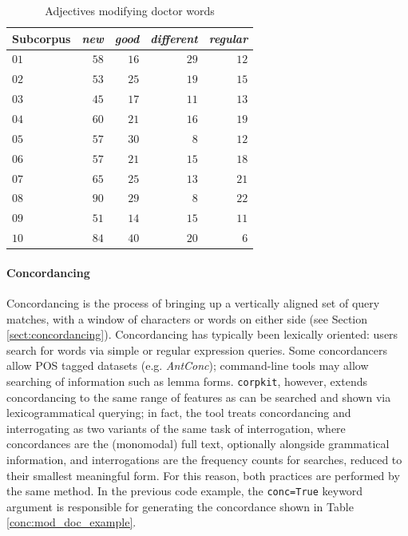 \FloatBarrier


\begin{table}[htb]
\centering
\small
\begin{tabular}{lrrrr}

\toprule
Subcorpus &  \emph{new} &  \emph{good} &  \emph{different} &  \emph{regular} \\
\midrule
$01$ &   $58$ &    $16$ &         $29$ &       $12$ \\
$02$ &   $53$ &    $25$ &         $19$ &       $15$ \\
$03$ &   $45$ &    $17$ &         $11$ &       $13$ \\
$04$ &   $60$ &    $21$ &         $16$ &       $19$ \\
$05$ &   $57$ &    $30$ &         $ 8$ &       $12$ \\
$06$ &   $57$ &    $21$ &         $15$ &       $18$ \\
$07$ &   $65$ &    $25$ &         $13$ &       $21$ \\
$08$ &   $90$ &    $29$ &         $ 8$ &       $22$ \\
$09$ &   $51$ &    $14$ &         $15$ &       $11$ \\
$10$ &   $84$ &    $40$ &         $20$ &       $ 6$ \\
\bottomrule
\end{tabular}
\caption{Adjectives modifying doctor words}
\label{conc:adj_mod_doc_example}
\end{table}

\paragraph{Concordancing}

Concordancing is the process of bringing up a vertically aligned set of query matches, with a window of characters or words on either side (see Section \ref{sect:concordancing}). Concordancing has typically been lexically oriented: users search for words via simple or regular expression queries. Some concordancers allow \gls{POS} tagged datasets (e.g. \emph{AntConc}); command\hyp{}line tools may allow searching of information such as lemma forms. \texttt{corpkit}, however, extends concordancing to the same range of features as can be searched and shown via lexicogrammatical querying; in fact, the tool treats concordancing and interrogating as two variants of the same task of interrogation, where concordances are the (monomodal) full text, optionally alongside grammatical information, and  interrogations are the frequency counts for searches, reduced to their smallest meaningful form. For this reason, both practices are performed by the same method. In the previous code example, the \texttt{conc=True} keyword argument is responsible for generating the concordance shown in Table \ref{conc:mod_doc_example}.

